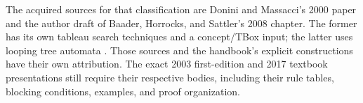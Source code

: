 The acquired sources for that classification are Donini and Massacci's
2000 paper and the author draft of Baader, Horrocks, and Sattler's
2008 chapter.  The former has its own tableau search techniques and a
concept/TBox input; the latter uses looping tree automata
\cite[Theorem~3.13, p.~98]{DoniniMassacci2000}
\cite[draft Theorem~6, p.~26]{BaaderHorrocksSattler2008}.
Those sources and the handbook's explicit constructions have their own
attribution.  The exact 2003 first-edition and 2017 textbook presentations
still require their respective bodies, including their rule tables,
blocking conditions, examples, and proof organization.

